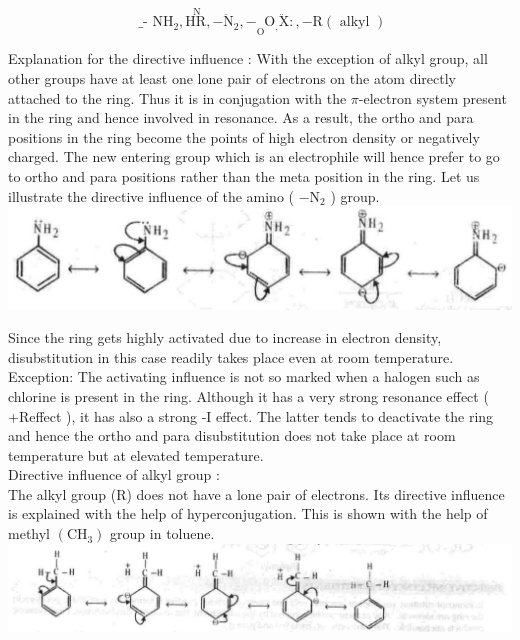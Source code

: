 \documentclass[10pt]{article}
\begin{document}
$$
\text { _- } \mathrm{NH}_{2}, \stackrel{\mathrm{~N}}{\mathrm{HR}},-\ddot{\mathrm{N}}_{2},-\underset{\mathrm{O}}{ } \mathrm{O}_{,} \ddot{\mathrm{X}}:,-\mathrm{R}(\text { alkyl })
$$

Explanation for the directive influence : With the exception of alkyl group, all other groups have at least one lone pair of electrons on the atom directly attached to the ring. Thus it is in conjugation with the $\pi$-electron system present in the ring and hence involved in resonance. As a result, the ortho and para positions in the ring become the points of high electron density or negatively charged. The new entering group which is an electrophile will hence prefer to go to ortho and para positions rather than the meta position in the ring. Let us illustrate the directive influence of the amino ( $-\mathrm{N}_{2}$ ) group.\\
\includegraphics[max width=\textwidth, center]{2025_01_28_8470952b98110cec3aabg-212}

Since the ring gets highly activated due to increase in electron density, disubstitution in this case readily takes place even at room temperature.\\
Exception: The activating influence is not so marked when a halogen such as chlorine is present in the ring. Although it has a very strong resonance effect ( +Reffect ), it has also a strong -I effect. The latter tends to deactivate the ring and hence the ortho and para disubstitution does not take place at room temperature but at elevated temperature.\\
Directive influence of alkyl group :\\
The alkyl group (R) does not have a lone pair of electrons. Its directive influence is explained with the help of hyperconjugation. This is shown with the help of methyl $\left(\mathrm{CH}_{3}\right)$ group in toluene.\\
\includegraphics[max width=\textwidth, center]{2025_01_28_8470952b98110cec3aabg-212(2)}
\end{document}

